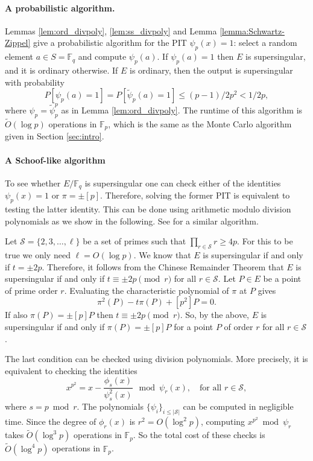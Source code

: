 \documentclass[review]{elsarticle}
\theoremstyle{plain}
\theoremstyle{definition}
\newcommand{\abs}[1]{\left\vert#1\right\vert}
\newcommand{\tildO}{\tilde{O}}
\def\F{\ensuremath{\mathbb{F}}}
\begin{document}
\paragraph{A probabilistic algorithm.}
Lemmas \ref{lem:ord_divpoly}, \ref{lem:ss_divpoly} and Lemma \ref{lemma:Schwartz-Zippel} give a 
probabilistic algorithm for the PIT $\psi_p(x) = 1$: select a random element $a \in S = \F_q$ and 
compute $\psi_p(a)$. If $\psi_p(a) = 1$ then $E$ is supersingular, and it is ordinary otherwise. If 
$E$ is ordinary, then the output is supersingular with probability 
\[ P[\psi_p(a) = 1] = P[\tilde{\psi}_p(a) = 1] \le (p - 1) / 2p^2 < 1 / 2p, \] 
where $\psi_p = \tilde{\psi}_p^p$ as in Lemma \ref{lem:ord_divpoly}. The runtime of this algorithm 
is $\tildO(\log p)$ operations in $\F_p$, which is the same as the Monte Carlo algorithm given in 
Section \ref{sec:intro}.

\paragraph{A Schoof-like algorithm}
To see whether $E/\F_q$ is supersingular one can check either of the identities $\psi_p(x) = 1$ or 
$\pi = \pm [p]$. Therefore, solving the former PIT is equivalent to testing the latter identity. 
This can be done using arithmetic modulo division polynomials as we show in the following. See 
\cite[Section 2.2]{sutherland2012} for a similar algorithm.

Let $\mathcal{S} = \{2, 3, \dots, \ell\}$ be a set of primes such that $\prod_{r \in \mathcal{S}} r 
\ge 4p$. For this to be true we only need $\ell = O(\log p)$. We know that $E$ is supersingular if 
and only if $t = \pm 2p$. Therefore, it follows from the Chinese Remainder Theorem that $E$ is 
supersingular if and only if $t \equiv \pm 2p \pmod{r}$ for all $r \in \mathcal{S}$. Let $P \in E$ 
be a point of prime order $r$. Evaluating the characteristic polynomial of $\pi$ at $P$ gives
\[ \pi^2(P) - t\pi(P) + [p^2]P = 0. \]
If also $\pi(P) = \pm [p]P$ then $t \equiv \pm 2p \pmod{r}$. So, by the above, $E$ is supersingular 
if and only if $\pi(P) = \pm [p]P$ for a point $P$ of order $r$ for all $r \in \mathcal{S}$.

The last condition can be checked using division polynomials. More precisely, it is equivalent to 
checking the identities
\begin{equation}
\label{equ:schoof}
	x^{p^2} = x - \frac{\phi_s(x)}{\psi_s^2(x)} ~ \bmod \psi_r(x), \quad \text{for all } r \in 
	\mathcal{S},
\end{equation}
where $s = p \bmod r$. The polynomials $\{ \psi_i \}_{i \le \abs{\mathcal{S}}}$ can be computed in 
negligible time. Since the degree of $\phi_r(x)$ is $r^2 = O(\log^2 p)$, computing $x^{p^2} \bmod 
\psi_r$ takes $\tildO(\log^3 p)$ operations in $\F_p$. So the total cost of these checks is 
$\tildO(\log^4 p)$ operations in $\F_p$.
\end{document}
